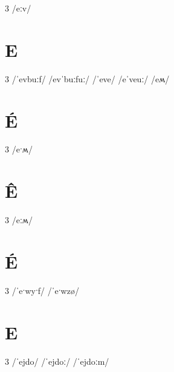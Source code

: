 \documentclass[10pt,a4paper,twoside]{book}
\begin{document}
\begin{multicols}{3}
 {/eːv/} {}
\end{multicols}

\section*{E}

\begin{multicols}{3}
 {/ˈevbuːf/} {}
 {/evˈbuːfuː/} {}
 {/ˈeve/} {}
 {/eˈveuː/} {}
 {/eʍ/} {}
\end{multicols}

\section*{É}

\begin{multicols}{3}
 {/eˑʍ/} {}
\end{multicols}

\section*{Ê}

\begin{multicols}{3}
 {/eːʍ/} {}
\end{multicols}

\section*{É}

\begin{multicols}{3}
 {/ˈeˑwyˑf/} {}
 {/ˈeˑwzø/} {}
\end{multicols}

\section*{E}

\begin{multicols}{3}
 {/ˈejdo/} {}
 {/ˈejdoː/} {}
 {/ˈejdoːm/} {}
\end{multicols}
\end{document}
